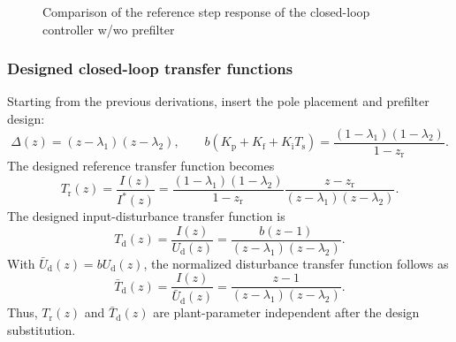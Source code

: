 \begin{frame}
\begin{figure}
        \caption{Comparison of the reference step response of the closed-loop controller w/wo prefilter}
        \label{fig:pre_filter_impact_FOC_current_control}
    \end{figure}
\end{frame}

\begin{frame}
    \frametitle{Designed closed-loop transfer functions}
    Starting from the previous derivations, insert the pole placement and prefilter design:
    \begin{equation}
        \Delta(z)=(z-\lambda_1)(z-\lambda_2),\qquad
        b(K_\mathrm{p}+K_\mathrm{f}+K_\mathrm{i}T_\mathrm{s})
        =\frac{(1-\lambda_1)(1-\lambda_2)}{1-z_\mathrm{r}} .
        \label{eq:tf_design_insert}
    \end{equation}\pause%
    The designed reference transfer function becomes
    \begin{equation}
        T_\mathrm{r}(z)
        =\frac{I(z)}{I^{*}(z)}
        =
        \frac{(1-\lambda_1)(1-\lambda_2)}{1-z_\mathrm{r}}
        \frac{z-z_\mathrm{r}}{(z-\lambda_1)(z-\lambda_2)} .
        \label{eq:designed_reference_tf}
    \end{equation}\pause%
    The designed input-disturbance transfer function is
    \begin{equation}
        T_\mathrm{d}(z)
        =\frac{I(z)}{U_\mathrm{d}(z)}
        =\frac{b(z-1)}{(z-\lambda_1)(z-\lambda_2)} .
        \label{eq:designed_disturbance_tf}
    \end{equation}\pause%
    With $\bar U_\mathrm{d}(z)=bU_\mathrm{d}(z)$, the normalized disturbance transfer function follows as
    \begin{equation}
        \bar T_\mathrm{d}(z)
        =\frac{I(z)}{\bar U_\mathrm{d}(z)}
        =\frac{z-1}{(z-\lambda_1)(z-\lambda_2)} .
        \label{eq:normalized_disturbance_tf}
    \end{equation}\pause%
    Thus, $T_\mathrm{r}(z)$ and $\bar T_\mathrm{d}(z)$ are plant-parameter independent after the design substitution.
\end{frame}

